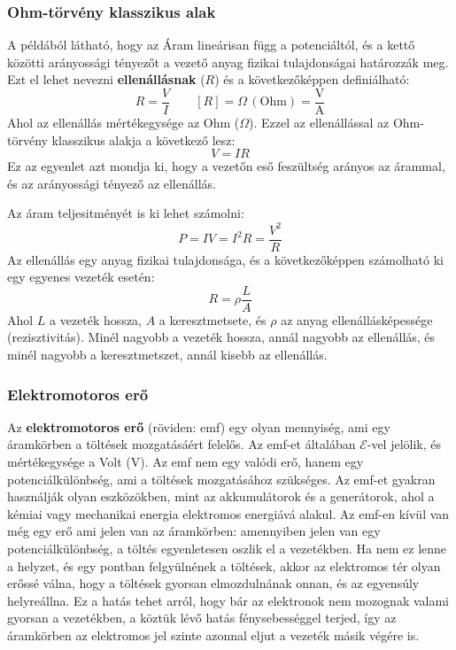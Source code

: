 \documentclass[a4paper,12pt]{article}
\begin{document}
\subsubsection{Ohm-törvény klasszikus alak}
A példából látható, hogy az Áram lineárisan függ a potenciáltól, és a kettő közötti arányossági tényezőt a vezető anyag fizikai 
tulajdonságai határozzák meg. Ezt el lehet nevezni \textbf{ellenállásnak} ($R$) és a következőképpen definiálható:
\begin{equation}
    R = \frac{V}{I} \qquad \left[R\right] = \Omega \, (\text{Ohm}) = \frac{\text{V}}{\text{A}}
\end{equation}
Ahol az ellenállás mértékegysége az Ohm ($\Omega$). Ezzel az ellenállással az Ohm-törvény klasszikus alakja a következő lesz:
\begin{equation}
    \boxed{V = IR}
\end{equation}
Ez az egyenlet azt mondja ki, hogy a vezetőn eső feszültség arányos az árammal, és az arányossági tényező az ellenállás.

Az áram teljesitményét is ki lehet számolni:
\begin{equation}
    P = IV = I^2 R = \frac{V^2}{R}
\end{equation}
Az ellenállás egy anyag fizikai tulajdonsága, és a következőképpen számolható ki egy egyenes vezeték esetén:
\begin{equation}
    R = \rho \frac{L}{A}
\end{equation}
Ahol $L$ a vezeték hossza, $A$ a keresztmetsete, és $\rho$ az anyag ellenállásképessége (rezisztivitás). Minél nagyobb a vezeték hossza, annál nagyobb az ellenállás, és minél nagyobb a keresztmetszet, annál kisebb az ellenállás.

\subsubsection{Elektromotoros erő}
Az \textbf{elektromotoros erő} (röviden: emf) egy olyan mennyiség, ami egy áramkörben a töltések mozgatásáért felelős. Az emf-et általában $ \mathcal{E} $-vel jelölik, és mértékegysége a Volt (V). Az emf nem egy valódi erő, hanem egy potenciálkülönbség, ami a töltések mozgatásához szükséges. Az emf-et gyakran használják olyan eszközökben, mint az akkumulátorok és a generátorok, ahol a kémiai vagy mechanikai energia elektromos energiává alakul.
Az emf-en kívül van még egy erő ami jelen van az áramkörben: amennyiben jelen van egy potenciálkülönbség, a töltés egyenletesen oszlik el a vezetékben. Ha nem ez lenne a helyzet, és egy pontban felgyülnének a töltések, akkor az elektromos tér olyan erőssé válna, hogy a töltések gyorsan elmozdulnának onnan, és az egyensúly helyreállna.
Ez a hatás tehet arról, hogy bár az elektronok nem mozognak valami gyorsan a vezetékben, a köztük lévő hatás fénysebességgel terjed, így az áramkörben az elektromos jel szinte azonnal eljut a vezeték másik végére is.
\end{document}
